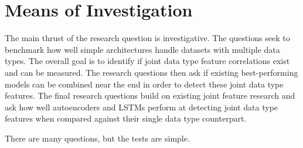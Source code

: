 \section{Means of Investigation} %

The main thrust of the research question is investigative.  The questions seek to benchmark how well simple architectures handle datasets with multiple data types. The overall goal is to identify if joint data type feature correlations exist and can be measured.  The research questions then ask if existing best-performing models can be combined near the end in order to detect these joint data type features.  The final research questions build on existing joint feature research and ask how well autoencoders and LSTMs perform at detecting joint data type features when compared against their single data type counterpart.

There are many questions, but the tests are simple. 




